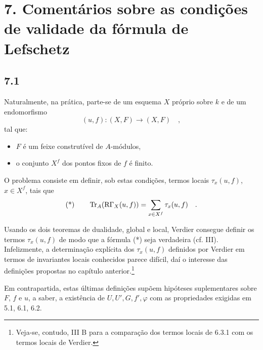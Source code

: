\section*{7. Comentários sobre as condições de validade da fórmula de Lefschetz}

\subsection*{7.1}
Naturalmente, na prática, parte-se de um esquema $X$ próprio sobre $k$ e de um endomorfismo
\[
(u, f) : (X, F) \longrightarrow (X, F) \quad ,
\]
tal que:
\begin{itemize}
\item $F$ é um feixe construtível de $A$-módulos,
\item o conjunto $X^f$ dos pontos fixos de $f$ é finito.
\end{itemize}

O problema consiste em definir, sob estas condições, termos locais $\tau_x(u, f)$, $x \in X^f$, tais que
\[
\text{(*)} \qquad \operatorname{Tr}_A(\mathrm{R}\Gamma_X(u, f)) = \sum_{x \in X^f} \tau_x(u, f) \quad .
\]

Usando os dois teoremas de dualidade, global e local, Verdier consegue definir os termos $\tau_x(u, f)$ de modo que a fórmula (*) seja verdadeira (cf. III). Infelizmente, a determinação explícita dos $\tau_x(u, f)$ definidos por Verdier em termos de invariantes locais conhecidos parece difícil, daí o interesse das definições propostas no capítulo anterior.\footnote{Veja-se, contudo, III B para a comparação dos termos locais de 6.3.1 com os termos locais de Verdier.}

Em contrapartida, estas últimas definições supõem hipóteses suplementares sobre $F$, $f$ e $u$, a saber, a existência de $U, U', G, f', \varphi$ com as propriedades exigidas em 5.1, 6.1, 6.2.
